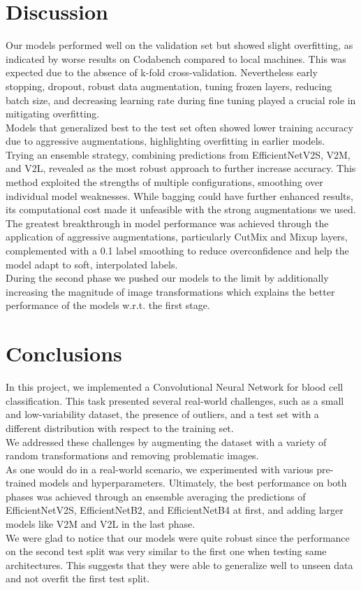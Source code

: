 \documentclass[11pt]{article}
\begin{document}
\begin{multicols}{2}
    \section{Discussion}

    Our models performed well on the validation set but showed slight overfitting, as indicated by worse results on Codabench compared to local machines. This was expected due to the absence of k-fold cross-validation. Nevertheless early stopping, dropout, robust data augmentation, tuning frozen layers, reducing batch size, and decreasing learning rate during fine tuning played a crucial role in mitigating overfitting.\\
    Models that generalized best to the test set often showed lower training accuracy due to aggressive augmentations, highlighting overfitting in earlier models.\\
    Trying an ensemble strategy, combining predictions from EfficientNetV2S, V2M, and V2L, revealed as the most robust approach to further increase accuracy. This method exploited the strengths of multiple configurations, smoothing over individual model weaknesses. While bagging could have further enhanced results, its computational cost made it unfeasible with the strong augmentations we used.\\
    The greatest breakthrough in model performance was achieved through the application of aggressive augmentations, particularly CutMix and Mixup layers, complemented with a 0.1 label smoothing to reduce overconfidence and help the model adapt to soft, interpolated labels.\\
    During the second phase we pushed our models to the limit by additionally increasing the magnitude of image transformations which explains the better performance of the models w.r.t. the first stage.

    \section{Conclusions}

    In this project, we implemented a Convolutional Neural Network for blood cell classification. This task presented several real-world challenges, such as a small and low-variability dataset, the presence of outliers, and a test set with a different distribution with respect to the training set.\\
    We addressed these challenges by augmenting the dataset with a variety of random transformations and removing problematic images.\\
    As one would do in a real-world scenario, we experimented with various pre-trained models and hyperparameters. Ultimately, the best performance on both phases was achieved through an ensemble averaging the predictions of EfficientNetV2S, EfficientNetB2, and EfficientNetB4 at first, and adding larger models like V2M and V2L in the last phase.\\
    We were glad to notice that our models were quite robust since the performance on the second test split was very similar to the first one when testing same architectures. This suggests that they were able to generalize well to unseen data and not overfit the first test split.
    

\end{multicols}
\end{document}
